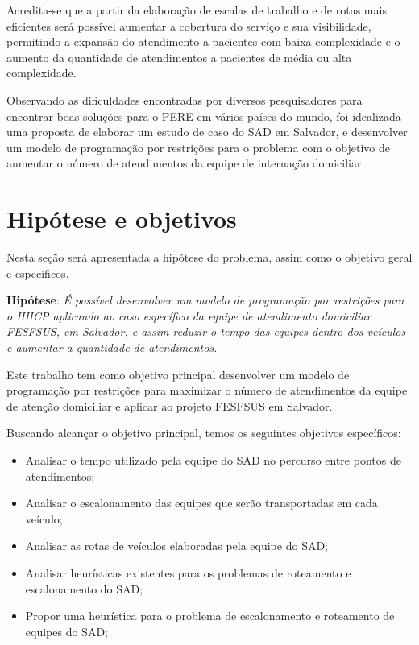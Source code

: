 Acredita-se que a partir da elaboração de escalas de trabalho e de rotas mais eficientes será possível aumentar a cobertura do serviço e sua visibilidade, permitindo a expansão do atendimento a pacientes com baixa complexidade e o aumento da quantidade de atendimentos a pacientes de média ou alta complexidade.  

Observando as dificuldades encontradas por diversos pesquisadores para encontrar boas soluções para o \ac{PERE} em vários países do mundo, foi idealizada uma proposta de elaborar um estudo de caso do \ac{SAD} em Salvador, e desenvolver um modelo de programação por restrições para o problema com o objetivo de aumentar o número de atendimentos da equipe de internação domiciliar. 


\section{Hipótese e objetivos}

Nesta seção será apresentada a hipótese do problema, assim como o objetivo geral e específicos.

\textbf{Hipótese}: \emph{É possível desenvolver um modelo de programação por restrições para o \ac{HHCP} aplicando ao caso específico da equipe de atendimento domiciliar FESFSUS, em Salvador, e assim reduzir o tempo das equipes dentro dos veículos e aumentar a quantidade de atendimentos.}

Este trabalho tem como objetivo principal desenvolver um modelo de programação por restrições para maximizar o número de atendimentos da equipe de atenção domiciliar e aplicar ao projeto FESFSUS em Salvador. 

Buscando alcançar o objetivo principal, temos os seguintes objetivos específicos:
\begin{itemize}
\item Analisar o tempo utilizado pela equipe do \ac{SAD} no percurso entre pontos de atendimentos;
\item Analisar o escalonamento das equipes que serão transportadas em cada veículo;
\item Analisar as rotas de veículos elaboradas pela equipe do \ac{SAD};
\item Analisar heurísticas existentes para os problemas de roteamento e escalonamento do \ac{SAD};
\item Propor uma heurística para o problema de escalonamento e roteamento de equipes do \ac{SAD};
\end{itemize}

